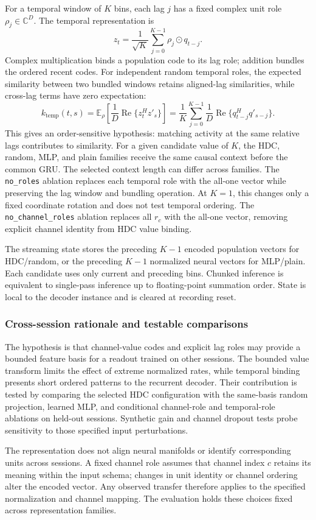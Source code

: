 For a temporal window of $K$ bins, each lag $j$ has a fixed complex unit role
$\rho_j\in\mathbb{C}^D$. The temporal representation is
\[
  z_t=\frac{1}{\sqrt{K}}\sum_{j=0}^{K-1}
        \rho_j\odot q_{t-j}.
\]
Complex multiplication binds a population code to its lag role; addition
bundles the ordered recent codes. For independent random temporal roles, the
expected similarity between two bundled windows retains aligned-lag
similarities, while cross-lag terms have zero expectation:
\[
 k_{\mathrm{temp}}(t,s)
  =\mathbb{E}_{\rho}\!\left[\frac{1}{D}
          \operatorname{Re}\{z_t^Hz'_s\}\right]
   =\frac{1}{K}\sum_{j=0}^{K-1}
       \frac{1}{D}\operatorname{Re}\{q_{t-j}^Hq'_{s-j}\}.
\]
This gives an order-sensitive hypothesis: matching activity at the same
relative lags contributes to similarity. For a given candidate value of $K$,
the HDC, random, MLP, and plain families receive the same causal context
before the common GRU. The selected context length can differ across families.
The \texttt{no\_roles} ablation replaces each temporal role with the all-one
vector while preserving the lag window and bundling operation. At $K=1$, this
changes only a fixed coordinate rotation and does not test temporal ordering. The
\texttt{no\_channel\_roles} ablation replaces all $r_c$ with the all-one
vector, removing explicit channel identity from HDC value binding.

The streaming state stores the preceding $K-1$ encoded population vectors for
HDC/random, or the preceding $K-1$ normalized neural vectors for MLP/plain. Each
candidate uses only current and preceding bins. Chunked inference is
equivalent to single-pass inference up to floating-point summation order. State
is local to the decoder instance and is cleared at recording reset.

\subsubsection{Cross-session rationale and testable comparisons}

The hypothesis is that channel-value codes and explicit lag roles may provide
a bounded feature basis for a readout trained on other sessions. The bounded
value transform limits the effect of extreme normalized rates, while temporal
binding presents short ordered patterns to the recurrent decoder. Their
contribution is tested by comparing the selected HDC configuration with the
same-basis random projection, learned MLP, and conditional channel-role and
temporal-role ablations on held-out sessions. Synthetic gain and channel
dropout tests probe sensitivity to those specified input perturbations.

The representation does not align neural manifolds or identify corresponding
units across sessions. A fixed channel role assumes that channel index $c$
retains its meaning within the input schema; changes in unit identity or
channel ordering alter the encoded vector. Any observed transfer therefore
applies to the specified normalization and channel mapping. The evaluation
holds these choices fixed across representation families.
